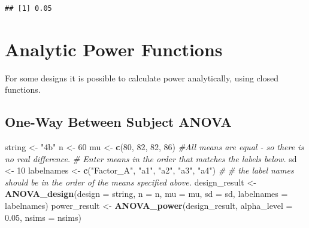 \documentclass[]{book}
\newenvironment{Shaded}{\begin{snugshade}}{\end{snugshade}}
\newcommand{\CommentTok}[1]{\textcolor[rgb]{0.56,0.35,0.01}{\textit{#1}}}
\newcommand{\DataTypeTok}[1]{\textcolor[rgb]{0.13,0.29,0.53}{#1}}
\newcommand{\DecValTok}[1]{\textcolor[rgb]{0.00,0.00,0.81}{#1}}
\newcommand{\FloatTok}[1]{\textcolor[rgb]{0.00,0.00,0.81}{#1}}
\newcommand{\KeywordTok}[1]{\textcolor[rgb]{0.13,0.29,0.53}{\textbf{#1}}}
\newcommand{\NormalTok}[1]{#1}
\newcommand{\OperatorTok}[1]{\textcolor[rgb]{0.81,0.36,0.00}{\textbf{#1}}}
\newcommand{\StringTok}[1]{\textcolor[rgb]{0.31,0.60,0.02}{#1}}
\begin{document}
\begin{Shaded}
\end{Shaded}

\begin{verbatim}
## [1] 0.05
\end{verbatim}

\hypertarget{analytic-power-functions}{%
\chapter{Analytic Power Functions}\label{analytic-power-functions}}

For some designs it is possible to calculate power analytically, using closed functions.

\hypertarget{one-way-between-subject-anova}{%
\section{One-Way Between Subject ANOVA}\label{one-way-between-subject-anova}}

\begin{Shaded}
\begin{Highlighting}[]
\NormalTok{string <-}\StringTok{ "4b"}
\NormalTok{n <-}\StringTok{ }\DecValTok{60}
\NormalTok{mu <-}\StringTok{ }\KeywordTok{c}\NormalTok{(}\DecValTok{80}\NormalTok{, }\DecValTok{82}\NormalTok{, }\DecValTok{82}\NormalTok{, }\DecValTok{86}\NormalTok{) }\CommentTok{#All means are equal - so there is no real difference.}
\CommentTok{# Enter means in the order that matches the labels below.}
\NormalTok{sd <-}\StringTok{ }\DecValTok{10}
\NormalTok{labelnames <-}\StringTok{ }\KeywordTok{c}\NormalTok{(}\StringTok{"Factor_A"}\NormalTok{, }\StringTok{"a1"}\NormalTok{, }\StringTok{"a2"}\NormalTok{, }\StringTok{"a3"}\NormalTok{, }\StringTok{"a4"}\NormalTok{) }\CommentTok{#}
\CommentTok{# the label names should be in the order of the means specified above.}
\NormalTok{design_result <-}\StringTok{ }\KeywordTok{ANOVA_design}\NormalTok{(}\DataTypeTok{design =}\NormalTok{ string,}
                   \DataTypeTok{n =}\NormalTok{ n, }
                   \DataTypeTok{mu =}\NormalTok{ mu, }
                   \DataTypeTok{sd =}\NormalTok{ sd, }
                   \DataTypeTok{labelnames =}\NormalTok{ labelnames)}
\NormalTok{power_result <-}\StringTok{ }\KeywordTok{ANOVA_power}\NormalTok{(design_result, }\DataTypeTok{alpha_level =} \FloatTok{0.05}\NormalTok{, }\DataTypeTok{nsims =}\NormalTok{ nsims)}
\end{Highlighting}
\end{Shaded}
\end{document}
